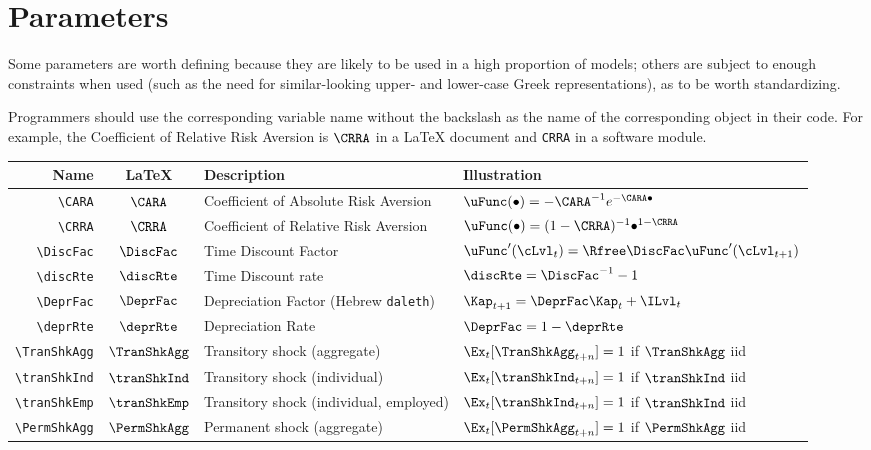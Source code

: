 \documentclass{econark}
\begin{document}
\section{Parameters}
Some parameters are worth defining because they are likely to be
used in a high proportion of models; others are subject to enough
constraints when used (such as the need for similar-looking upper-
and lower-case Greek representations), as to be worth standardizing.

Programmers should
use the corresponding variable name without the backslash as the name of the corresponding object
in their code.  For example, the Coefficient of Relative Risk Aversion is $\verb|\CRRA|$ in a \LaTeX
document and \texttt{CRRA} in a software module.

\hypertarget{Parameters}{}
\begin{table}[ht]
  \centering
  \begin{tabular}{|>{\ttfamily}rcll|}
    \hline
    Name                   & \LaTeX         & Description & Illustration
    \\ \hline
    \verb|\CARA|           & $\CARA$       & Coefficient of Absolute Risk Aversion &$\uFunc(\bullet)=-\CARA^{-1} e^{-\CARA \bullet}$
    \\ \verb|\CRRA|        & $\CRRA$       & Coefficient of Relative Risk Aversion & $\uFunc(\bullet)=(1-\CRRA)^{-1}\bullet^{1-\CRRA}$
    \\ \verb|\DiscFac|     & $\DiscFac$    & Time Discount Factor & $\uFunc^{\prime}(\cLvl_{t}) =  \Rfree \DiscFac \uFunc^{\prime}(\cLvl_{t+1})$
    \\ \verb|\discRte|     & $\discRte$    & Time Discount rate & $\discRte=\DiscFac^{-1}-1$
    \\ \verb|\DeprFac|     & $\DeprFac$    & Depreciation Factor (Hebrew \texttt{daleth}) & $\Kap_{t+1} = \DeprFac \Kap_{t}+\ILvl_{t}$
    \\ \verb|\deprRte|     & $\deprRte$    & Depreciation Rate & $\DeprFac = 1-\deprRte$
    \\ \verb|\TranShkAgg|  & $\TranShkAgg$ & Transitory shock (aggregate) & $\Ex_{t}[\TranShkAgg_{t+n}]=1$ if $\TranShkAgg$ iid
    \\ \verb|\tranShkInd|  & $\tranShkInd$ & Transitory shock (individual) &  $\Ex_{t}[\tranShkInd_{t+n}]=1$ if $\tranShkInd$ iid
    \\ \verb|\tranShkEmp|  & $\tranShkEmp$ & Transitory shock (individual, employed) &  $\Ex_{t}[\tranShkInd_{t+n}]=1$ if $\tranShkInd$ iid
    \\ \verb|\PermShkAgg|  & $\PermShkAgg$ & Permanent shock (aggregate) & $\Ex_{t}[\PermShkAgg_{t+n}]=1$ if $\PermShkAgg$ iid

\end{tabular}
\end{table}
\end{document}
